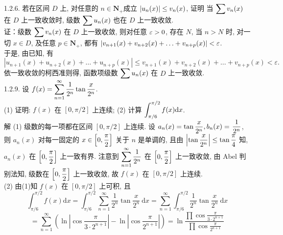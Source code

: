 \documentclass[a4paper,11pt,UTF8]{article}
\begin{document}
1.2.6. 若在区间 $D$ 上, 对任意的 $n \in \mathbf{N}_{+}$成立 $\displaystyle \displaystyle \displaystyle \left|u_n(x)\right| \leq v_n(x)$, 证明 当 $\displaystyle \displaystyle \displaystyle \sum v_n(x)$ 在 $D$ 上一致收敛时, 级数 $\displaystyle \displaystyle \displaystyle \sum u_n(x)$ 也在 $D$ 上一致收敛.\\
证：级数 $\displaystyle \displaystyle \displaystyle \sum v_n(x)$ 在 $D$ 上一致收敛, 则对任意 $\displaystyle \displaystyle \displaystyle \varepsilon>0$, 存在 $N$, 当 $n>N$ 时, 对一切 $x \in D$, 及任意 $p \in \mathbf{N}_{+}$, 都有 $\displaystyle \displaystyle \displaystyle \left|v_{n+1}(x)+v_{n+2}(x)+\ldots+v_{n+p}(x)\right|<\varepsilon$.\\
 于是, 由已知, 有
$$
\left|u_{n+1}(x)+u_{n+2}(x)+\ldots+u_{n+p}(x)\right| \leq v_{n+1}(x)+v_{n+2}(x)+\ldots+v_{n+p}(x)<\varepsilon .
$$
依一致收敛的柯西准则得, 函数项级数 $\displaystyle \displaystyle \displaystyle \sum u_n(x)$ 在 $D$ 上一致收敛.\\
1.2.9. 设 $\displaystyle \displaystyle \displaystyle f(x)=\sum_{n=1}^{\infty} \frac{1}{2^n} \tan \frac{x}{2^n}$.\\
(1) 证明: $\displaystyle f(x)$ 在 $[0, \pi / 2]$ 上连续; (2) 计算 $\displaystyle \displaystyle \displaystyle \int_{\pi / 6}^{\pi / 2} f(x) \mathrm{d} x$.\\
解 (1) 级数的每一项都在区间 $[0, \pi / 2]$ 上连续. 设 $\displaystyle \displaystyle \displaystyle a_n(x)=\tan \frac{x}{2^n}, b_n(x)=$ $\displaystyle \displaystyle \displaystyle \frac{1}{2^n}$, 则 $a_n(x)$ 对每一固定的 $\displaystyle \displaystyle \displaystyle x \in\left[0, \frac{\pi}{2}\right]$ 关于 $n$ 是单调的, 且由 $\displaystyle \displaystyle \displaystyle \left|\tan \frac{x}{2^n}\right| \leq \tan \frac{\pi}{4}$ 知, $a_n(x)$ 在 $\displaystyle \displaystyle \displaystyle \left[0, \frac{\pi}{2}\right]$ 上一致有界. 注意到 $\displaystyle \displaystyle \displaystyle \sum_{n=1}^{\infty} \frac{1}{2^n}$ 在 $\displaystyle \displaystyle \displaystyle \left[0, \frac{\pi}{2}\right]$ 上一致收敛, 由 Abel 判 别法知, 级数在 $\displaystyle \displaystyle \displaystyle \left[0, \frac{\pi}{2}\right]$ 上一致收敛, 故 $\displaystyle f(x)$ 在 $[0, \pi / 2]$ 上连续.\\
(2) 由(1)知 $\displaystyle f(x)$ 在 $[0, \pi / 2]$ 上可积, 且
$$
\int_{\pi / 6}^{\pi / 2} f(x) \mathrm{d} x=\int_{\pi / 6}^{\pi / 2} \sum_{n=1}^{\infty} \frac{1}{2^n} \tan \frac{x}{2^n} \mathrm{~d} x=\sum_{n=1}^{\infty} \int_{\pi / 6}^{\pi / 2} \frac{1}{2^n} \tan \frac{x}{2^n} \mathrm{~d} x
$$
$$
=\sum_{n=1}^{\infty}\left(\ln \left|\cos \frac{\pi}{3 \cdot 2^{n+1}}\right|-\ln \left|\cos \frac{\pi}{2^{n+1}}\right|\right)= \ln \frac{\prod \cos \frac{\pi}{3 \cdot 2^{n+1}}}{\prod \cos \frac{\pi}{2^{n+1}}}
$$
\end{document}

